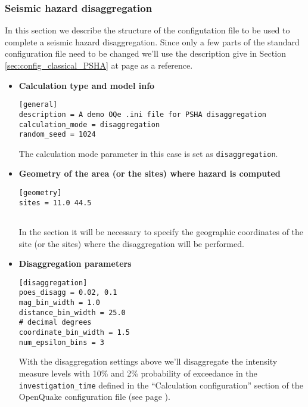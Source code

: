 \subsubsection{Seismic hazard disaggregation}
%
In this section we describe the structure of the configutation 
file to be used to complete a seismic hazard disaggregation. 
Since only a few parts of the standard configuration file need to 
be changed we'll use the description give in Section 
\ref{sec:config_classical_PSHA} at page 
\pageref{sec:config_classical_PSHA} as a reference.
%
\begin{itemize}
%
\item \textbf{Calculation type and model info}
\begin{Verbatim}[frame=single, commandchars=\\\{\}, fontsize=\small]
[general]
description = A demo OQe .ini file for PSHA disaggregation
calculation_mode = disaggregation
random_seed = 1024
\end{Verbatim}
The calculation mode parameter in this case is set as 
\texttt{disaggregation}.
%
\item \textbf{Geometry of the area (or the sites) where hazard is computed}
\begin{Verbatim}[frame=single, commandchars=\\\{\}, fontsize=\small]
[geometry]
sites = 11.0 44.5


\end{Verbatim}
In the section it will be necessary to specify the geographic 
coordinates of the site (or the sites) where the disaggregation
will be performed.
%
\item \textbf{Disaggregation parameters}
\begin{Verbatim}[frame=single, commandchars=\\\{\}, fontsize=\small]
[disaggregation]
poes_disagg = 0.02, 0.1
mag_bin_width = 1.0
distance_bin_width = 25.0
# decimal degrees
coordinate_bin_width = 1.5
num_epsilon_bins = 3
\end{Verbatim}
With the disaggregation settings above we'll disaggregate the intensity
measure levels with 10\% and 2\% probability of exceedance in the
\texttt{in\-ves\-ti\-gation\_time}  defined in the ``Calculation configuration''
section of the OpenQuake configuration file (see page 
\pageref{sec:calculation_configuration}).

\end{itemize}
